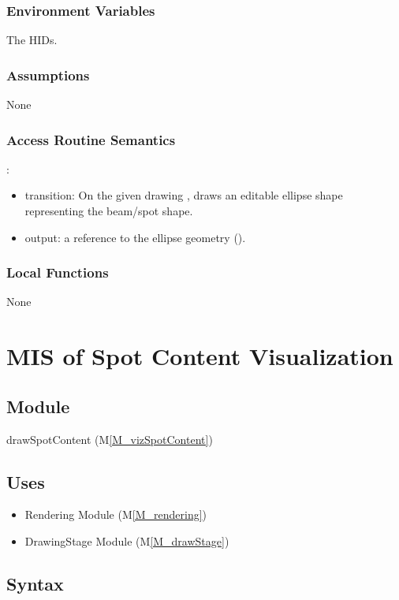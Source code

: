 \documentclass[12pt, titlepage]{article}
\newcommand{\mref}[1]{M\ref{#1}}
\newcommand{\mrefp}[1]{(\mref{#1})}
\newcommand{\mreff}[1]{Module \mrefp{#1}}
\begin{document}
\subsubsection{Environment Variables}
The HIDs.

\subsubsection{Assumptions}
None

\subsubsection{Access Routine Semantics}

\noindent {}:
\begin{itemize}
\item transition: On the given drawing ,
  draws an editable ellipse shape representing the beam/spot shape.
\item output: a reference to the ellipse geometry ().
\end{itemize}

\subsubsection{Local Functions}
None

\newpage



\section{MIS of Spot Content Visualization} \label{MS_vizSpotContent}

\subsection{Module}
drawSpotContent \mrefp{M_vizSpotContent}

\subsection{Uses}
\begin{itemize}
  \item Rendering \mreff{M_rendering}
  \item DrawingStage \mreff{M_drawStage}
\end{itemize}

\subsection{Syntax}
\end{document}
